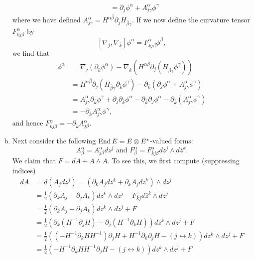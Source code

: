 \documentclass{../mathnotes}
\begin{document}
\begin{enumerate}[(a)]
\begin{align*}
            &=\partial_j\phi^\alpha+A^{\alpha}_{j\gamma}\phi^\gamma
        \end{align*}
        where we have defined $A^\alpha_{j\gamma}=H^{\alpha\bar\beta}\partial_jH_{\bar\beta\gamma}$. If we now define the curvature tensor $F_{\bar kj\beta}^\alpha$ by
        \[ [\nabla_j,\nabla_{\bar k}]\phi^\alpha=F_{\bar kj\beta}^\alpha\phi^\beta, \]
        we find that
        \begin{align*}
            [\nabla_j,\nabla_{\bar k}]\phi^\alpha&=\nabla_j(\partial_{\bar k}\phi^\alpha)-\nabla_{\bar k}\left( H^{\alpha\bar\beta}\partial_j(H_{\bar\beta\gamma}\phi^\gamma) \right)\\
            &=H^{\alpha\bar\beta}\partial_j\left( H_{\bar\beta\gamma}\partial_{\bar k}\phi^\gamma \right)-\partial_{\bar k}\left(\partial_j\phi^\alpha+A^\alpha_{j\gamma}\phi^\gamma \right)\\
            &=A^\alpha_{j\gamma}\partial_{\bar k}\phi^\gamma+\partial_j\partial_{\bar k}\phi^\alpha-\partial_{\bar k}\partial_j\phi^{\alpha}-\partial_{\bar k}\left( A_{j\gamma}^\alpha\phi^\gamma \right)\\
            &=-\partial_{\bar k}A_{j\gamma}^\alpha\phi^\gamma,
        \end{align*}
        and hence $F_{\bar kj\beta}^\alpha=-\partial_{\bar k}A_{j\beta}^\alpha$.
    \item Next consider the following $\operatorname{End} E=E\otimes E^*$-valued forms:
        \[A^\alpha_\beta=A_{j\beta}^\alpha dz^j\text{ and }F^\alpha_\beta=F_{\bar kj\beta}^\alpha dz^j\wedge d\bar z^k.\]
        We claim that $F=dA+A\wedge A$. To see this, we first compute (suppressing indices)
        \begin{align*}
            dA&=d(A_jdz^j)=(\partial_kA_jdz^k+\partial_{\bar k}A_jd\bar z^k)\wedge dz^j\\
            &=\frac{1}{2}(\partial_kA_j-\partial_jA_k)dz^k\wedge dz^j-F_{\bar kj}d\bar z^k\wedge dz^j\\
            &=\frac{1}{2}(\partial_kA_j-\partial_jA_k)dz^k\wedge dz^j+F\\
            &=\frac{1}{2}\left(\partial_k(H^{-1}\partial_jH)-\partial_j(H^{-1}\partial_kH)\right)dz^k\wedge dz^j+F\\
            &=\frac{1}{2}\left((-H^{-1}\partial_kHH^{-1})\partial_jH+H^{-1}\partial_k\partial_jH-(j\leftrightarrow k)\right)dz^k\wedge dz^j+F\\
            &=\frac{1}{2}\left(-H^{-1}\partial_kHH^{-1}\partial_jH-(j\leftrightarrow k)\right)dz^k\wedge dz^j+F\\

\end{align*}
\end{enumerate}
\end{document}
